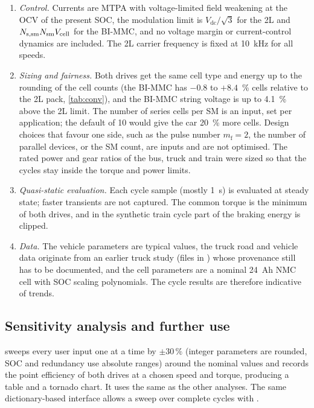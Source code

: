 \begin{enumerate}
\item \emph{Control.} Currents are MTPA with voltage-limited field weakening at the OCV of the present SOC, the modulation limit is $V_\mathrm{dc}/\sqrt3$ for the 2L and $N_\mathrm{s,sm}N_\mathrm{sm} V_\mathrm{cell}$ for the BI-MMC, and no voltage margin or current-control dynamics are included. The 2L carrier frequency is fixed at \SI{10}{\kilo\hertz} for all speeds.
\item \emph{Sizing and fairness.} Both drives get the same cell type and energy up to the rounding of the cell counts (the BI-MMC has $-0.8$ to $+8.4$~\% cells relative to the 2L pack, \cref{tab:conv}), and the BI-MMC string voltage is up to \SI{4.1}{\percent} above the 2L limit. The number of series cells per SM is an input, set per application; the default of 10 would give the car \SI{20}{\percent} more cells. Design choices that favour one side, such as the pulse number $m_\mathrm{f}=2$, the number of parallel devices, or the SM count, are inputs and are not optimised. The rated power and gear ratios of the bus, truck and train were sized so that the cycles stay inside the torque and power limits.
\item \emph{Quasi-static evaluation.} Each cycle sample (mostly \SI{1}{\second}) is evaluated at steady state; faster transients are not captured. The common torque is the minimum of both drives, and in the synthetic train cycle part of the braking energy is clipped.
\item \emph{Data.} The vehicle parameters are typical values, the truck road and vehicle data originate from an earlier truck study (files in ) whose provenance still has to be documented, and the cell parameters are a nominal 24~Ah NMC cell with SOC scaling polynomials. The cycle results are therefore indicative of trends.
\end{enumerate}

\subsection{Sensitivity analysis and further use}
 sweeps every user input one at a time by $\pm30\,\%$ (integer parameters are rounded, SOC and redundancy use absolute ranges) around the nominal values and records the point efficiency of both drives at a chosen speed and torque, producing a table and a tornado chart. It uses the same  as the other analyses. The same dictionary-based interface allows a sweep over complete cycles with .
